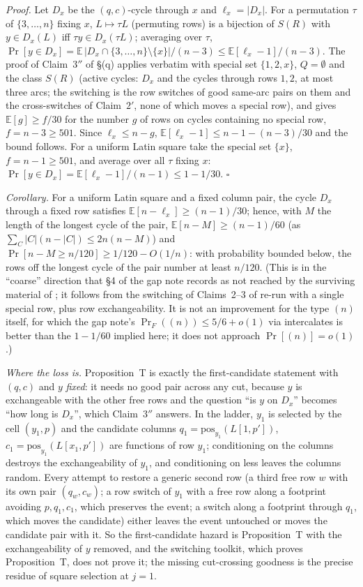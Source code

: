 \emph{Proof.}  Let $D_x$ be the $(q,c)$-cycle through $x$ and
$\ell_x=|D_x|$.  For a permutation $\tau$ of $\{3,\dots,n\}$ fixing
$x$, $L\mapsto\tau L$ (permuting rows) is a bijection of $S(R)$ with
$y\in D_x(L)$ iff $\tau y\in D_x(\tau L)$; averaging over $\tau$,
$\Pr[y\in D_x]=\mathbb E\,|D_x\cap\{3,\dots,n\}\setminus\{x\}|/(n-3)\le\mathbb E[\ell_x-1]/(n-3)$.
The proof of Claim~$3''$ of \S(q) applies verbatim with special set
$\{1,2,x\}$, $Q=\emptyset$ and the class $S(R)$ (active cycles: $D_x$
and the cycles through rows $1,2$, at most three arcs; the switching
is the row switches of good same-arc pairs on them and the
cross-switches of Claim~$2'$, none of which moves a special row), and
gives $\mathbb E[g]\ge f/30$ for the number $g$ of rows on cycles
containing no special row, $f=n-3\ge501$.  Since $\ell_x\le n-g$,
$\mathbb E[\ell_x-1]\le n-1-(n-3)/30$ and the bound follows.  For a
uniform Latin square take the special set $\{x\}$, $f=n-1\ge501$, and
average over all $\tau$ fixing $x$: $\Pr[y\in D_x]=\mathbb E[\ell_x-1]/(n-1)\le1-1/30$.  $\square$

\emph{Corollary.}  For a uniform Latin square and a fixed column
pair, the cycle $D_x$ through a fixed row satisfies
$\mathbb E[n-\ell_x]\ge(n-1)/30$; hence, with $M$ the length of the
longest cycle of the pair, $\mathbb E[n-M]\ge(n-1)/60$ (as
$\sum_C|C|(n-|C|)\le2n(n-M)$) and
$\Pr[n-M\ge n/120]\ge1/120-O(1/n)$: with probability bounded below,
the rows off the longest cycle of the pair number at least $n/120$.
(This is in the ``coarse'' direction that \S4 of the gap note records
as not reached by the surviving material of \cite{CGW08}; it follows
from the switching of Claims~2--3 of \cite{AM26} re-run with a single
special row, plus row exchangeability.  It is not an improvement for the type $(n)$
itself, for which the gap note's $\Pr_F((n))\le5/6+o(1)$ via
intercalates is better than the $1-1/60$ implied here; it does not
approach $\Pr[(n)]=o(1)$.)

\emph{Where the loss is.}  Proposition~T is exactly the
first-candidate statement with $(q,c)$ and $y$ \emph{fixed}: it needs
no good pair across any cut, because $y$ is exchangeable with the
other free rows and the question ``is $y$ on $D_x$'' becomes ``how
long is $D_x$'', which Claim~$3''$ answers.  In the ladder, $y_1$ is
selected by the cell $(y_1,p)$ and the candidate columns
$q_1=\mathrm{pos}_{y_1}(L[1,p'])$, $c_1=\mathrm{pos}_{y_1}(L[x_1,p'])$
are functions of row $y_1$; conditioning on the columns destroys the
exchangeability of $y_1$, and conditioning on less leaves the columns
random.  Every attempt to restore a generic second row (a third free
row $w$ with its own pair $(q_w,c_w)$; a row switch of $y_1$ with a
free row along a footprint avoiding $p,q_1,c_1$, which preserves the
event; a switch along a footprint through $q_1$, which moves the
candidate) either leaves the event untouched or moves the candidate
pair with it.  So the first-candidate hazard is Proposition~T with the
exchangeability of $y$ removed, and the switching toolkit, which
proves Proposition~T, does not prove it; the missing cut-crossing
goodness is the precise residue of square selection at $j=1$.

